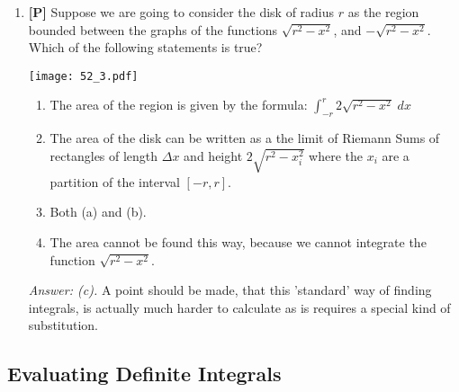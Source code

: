 \documentclass[12pt]{article}
\begin{document}
\begin{enumerate}
\item {\bf [P]} Suppose we are going to consider the disk of radius $r$ as
the region bounded between the graphs of the functions
$\sqrt{r^2-x^2}$, and $-\sqrt{r^2-x^2}$. Which of the following
statements is true?

\begin{center}
%
\texttt{[image: 52\_3.pdf]}
\end{center}

\begin{enumerate}
\item The area of the region is given by the formula:
$\int_{-r}^{r} {2\sqrt{r^2-x^2}}\;dx$
\item The area of the disk can be written as a the limit of Riemann
Sums of rectangles of length $\Delta x$ and height $2
\sqrt{r^2-x_i^2}$ where the $x_i$ are a partition of the interval
$[-r,r]$.
\item Both (a) and (b).
\item The area cannot be found this way, because we cannot
integrate the function $\sqrt{r^2-x^2}$.
\end{enumerate}

{\it Answer: (c).} A point should be made, that this 'standard'
way of finding integrals, is actually much harder to calculate as
is requires a special kind of substitution. 

\end{enumerate}


\subsection{Evaluating Definite Integrals}
\end{document}
